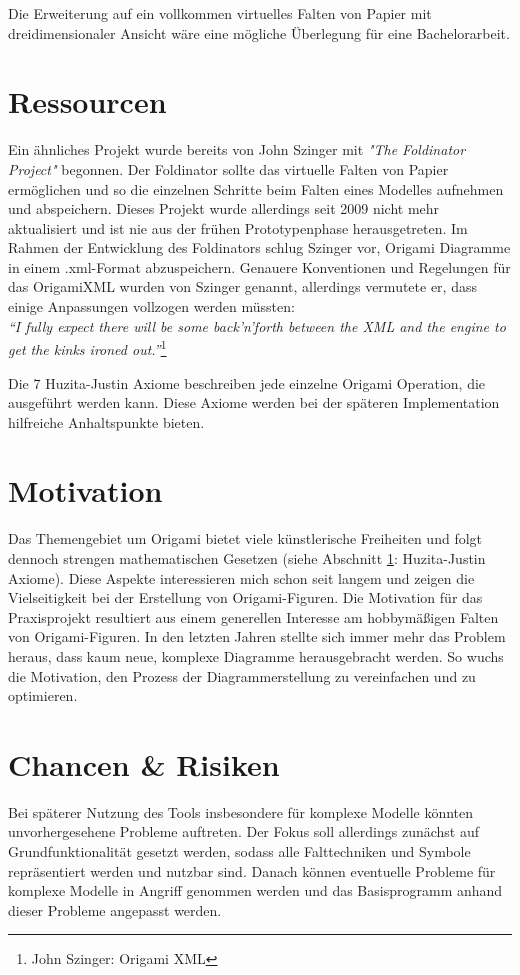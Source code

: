 \documentclass[12pt]{article}
\begin{document}
Die Erweiterung auf ein vollkommen virtuelles Falten von Papier mit dreidimensionaler Ansicht wäre eine mögliche Überlegung für eine Bachelorarbeit.

\section{Ressourcen}\label{ressourcen}

Ein ähnliches Projekt wurde bereits von John Szinger mit  \textit{"The Foldinator Project"}\cite{foldinator} begonnen. Der Foldinator sollte das virtuelle Falten von Papier ermöglichen und so die einzelnen Schritte beim Falten eines Modelles aufnehmen und abspeichern. Dieses Projekt wurde allerdings seit 2009 nicht mehr aktualisiert und ist nie aus der frühen Prototypenphase herausgetreten.
Im Rahmen der Entwicklung des Foldinators schlug Szinger vor, Origami Diagramme in einem .xml-Format abzuspeichern\cite{origamixml}. Genauere Konventionen und Regelungen für das OrigamiXML wurden von Szinger genannt, allerdings vermutete er, dass einige Anpassungen vollzogen werden müssten:\\
 
\textit{``I fully expect there will be some back'n'forth between the XML and the engine to get the kinks ironed out.''}\footnote{John Szinger: Origami XML\cite{origamixml}}

Die 7 Huzita-Justin Axiome \cite{hj_axioms} beschreiben jede einzelne Origami Operation, die ausgeführt werden kann. Diese Axiome werden bei der späteren Implementation hilfreiche Anhaltspunkte bieten.

\section{Motivation}
Das Themengebiet um Origami bietet viele künstlerische Freiheiten und folgt dennoch strengen mathematischen Gesetzen (siehe Abschnitt \ref{ressourcen}: Huzita-Justin Axiome). Diese Aspekte interessieren mich schon seit langem und zeigen die Vielseitigkeit bei der Erstellung von Origami-Figuren. Die Motivation für das Praxisprojekt resultiert aus einem generellen Interesse am hobbymäßigen Falten von Origami-Figuren. In den letzten Jahren stellte sich immer mehr das Problem heraus, dass kaum neue, komplexe Diagramme herausgebracht werden. So wuchs die Motivation, den Prozess der Diagrammerstellung zu vereinfachen und zu optimieren.

\section{Chancen \& Risiken}
Bei späterer Nutzung des Tools insbesondere für komplexe Modelle könnten unvorhergesehene Probleme auftreten. Der Fokus soll allerdings zunächst auf Grundfunktionalität gesetzt werden, sodass alle Falttechniken und Symbole repräsentiert werden und nutzbar sind. Danach können eventuelle Probleme für komplexe Modelle in Angriff genommen werden und das Basisprogramm anhand dieser Probleme angepasst werden.
\end{document}
